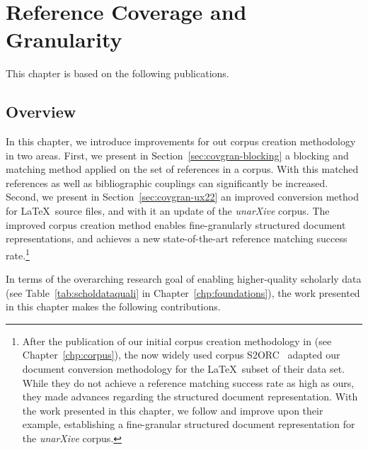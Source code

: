 \chapter{Reference Coverage and Granularity}
\label{chp:covgran}

This chapter is based on the following publications.
\begin{infobox-pub}
\end{infobox-pub}

\begin{infobox-pub}
\end{infobox-pub}

\section{Overview}
In this chapter, we introduce improvements for out corpus creation methodology in two areas.
First, we present in Section~\ref{sec:covgran-blocking} a blocking and matching method applied on the set of references in a corpus. With this matched references as well as bibliographic couplings can significantly be increased. %
Second, we present in Section~\ref{sec:covgran-ux22} an improved conversion method for \LaTeX\ source files, and with it an update of the \emph{unarXive} corpus. The improved corpus creation method enables fine-granularly structured document representations, and achieves a new state-of-the-art reference matching success rate.\footnote{After the publication of our initial corpus creation methodology in \cite{Saier2020} (see Chapter~\ref{chp:corpus}), the now widely used corpus S2ORC~\cite{Lo2020} adapted our document conversion methodology for the \LaTeX\ subset of their data set. While they do not achieve a reference matching success rate as high as ours, they made advances regarding the structured document representation. With the work presented in this chapter, we follow and improve upon their example, establishing a fine-granular structured document representation for the \emph{unarXive} corpus.}

In terms of the overarching research goal of enabling higher-quality scholarly data (see Table~\ref{tab:scholdataquali} in Chapter~\ref{chp:foundations}), the work presented in this chapter makes the following contributions.

